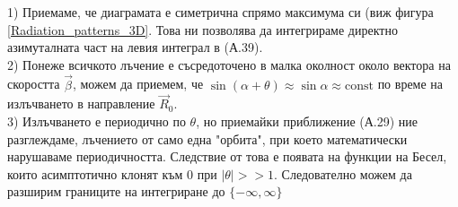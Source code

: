 \begin{appendices}
1) Приемаме, че диаграмата е симетрична спрямо максимума си (виж фигура \ref{Radiation_patterns_3D}. Това ни позволява да интегрираме директно азимуталната част на левия интеграл в (А.39).\\

2) Понеже всичкото лъчение е съсредоточено в малка околност около вектора на скоростта $\vec{\beta}$, можем да приемем, че $\sin(\alpha + \theta)\approx \sin\alpha\approx\text{const}$ по време на излъчването в направление $\vec{R}_0$.  \\

3) Излъчването е периодично по $\theta$, но приемайки приближение (А.29) ние разглеждаме, лъчението от само една "орбита", при което математически нарушаваме периодичността. Следствие от това е появата на функции на Бесел, които асимптотично клонят към 0 при $|\theta| >> 1$. Следователно можем да разширим границите на интегриране до $\{-\infty, \infty\}$
\end{appendices}